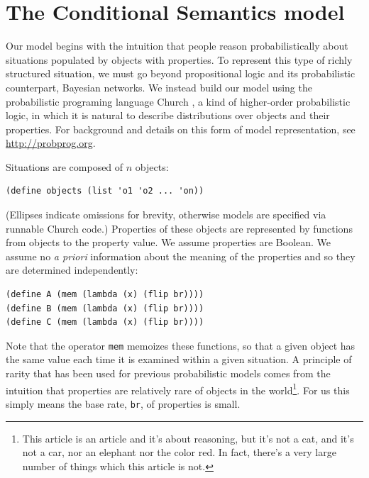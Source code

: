 \documentclass[10pt,letterpaper]{article}
\begin{document}
%
%

\section{The Conditional Semantics model}

Our model begins with the intuition that people reason probabilistically about situations populated by objects with properties. To represent this type of richly structured situation, we must go beyond propositional logic and its probabilistic counterpart, Bayesian networks. We instead build our model using the probabilistic programing language Church \cite{Goodman2008}, a kind of higher-order probabilistic logic, in which it is natural to describe distributions over objects and their properties. For background and details on this form of model representation, see \url{http://probprog.org}.

Situations are composed of $n$ objects:
\begin{lstlisting}
(define objects (list 'o1 'o2 ... 'on))
\end{lstlisting}
(Ellipses indicate omissions for brevity, otherwise models are specified via runnable Church code.)
Properties of these objects are represented by functions from objects to the property value. We assume properties are Boolean. We assume no \emph{a priori} information about the meaning of the properties and so they are determined independently:
\begin{lstlisting}
(define A (mem (lambda (x) (flip br))))
(define B (mem (lambda (x) (flip br))))
(define C (mem (lambda (x) (flip br))))
\end{lstlisting}
Note that the operator \lstinline{mem} memoizes these functions, so that a given object has the same value each time it is examined within a given situation. 
A principle of rarity that has been used for previous probabilistic models \cite{OCwasson} comes from the intuition that properties are relatively rare of objects in the world\footnote{This article is an article and it's about reasoning, but it's not a cat, and it's not a car, nor an elephant nor the color red. In fact, there's a very large number of things which this article is not.}. For us this simply means the base rate, \lstinline{br}, of properties is small.  
\end{document}
